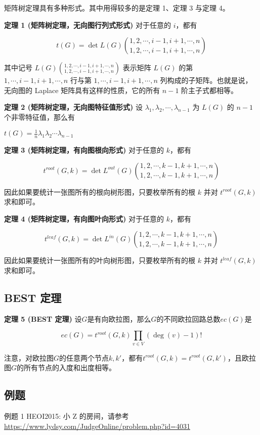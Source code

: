 矩阵树定理具有多种形式。其中用得较多的是定理 1、定理 3 与定理 4。

\textbf{定理 1 (矩阵树定理，无向图行列式形式)} 对于任意的 $i$，都有

$$
t(G) = \det L(G)\binom{1,2,\cdots,i-1,i+1,\cdots,n}{1,2,\cdots,i-1,i+1,\cdots,n}
$$

其中记号 $L(G)\binom{1,2,\cdots,i-1,i+1,\cdots,n}{1,2,\cdots,i-1,i+1,\cdots,n}$ 表示矩阵 $L(G)$ 的第 $1,\cdots,i-1,i+1,\cdots,n$ 行与第 $1,\cdots,i-1,i+1,\cdots,n$ 列构成的子矩阵。也就是说，无向图的 Laplace 矩阵具有这样的性质，它的所有 $n-1$ 阶主子式都相等。

\textbf{定理 2 (矩阵树定理，无向图特征值形式)} 设 $\lambda_1, \lambda_2, \cdots, \lambda_{n-1}$ 为 $L(G)$ 的 $n - 1$ 个非零特征值，那么有

$t(G) = \frac{1}{n}\lambda_1\lambda_2\cdots\lambda_{n-1}$

\textbf{定理 3 (矩阵树定理，有向图根向形式)} 对于任意的 $k$，都有

$$
t^{root}(G,k) = \det L^{out}(G)\binom{1,2,\cdots,k-1,k+1,\cdots,n}{1,2,\cdots,k-1,k+1,\cdots,n}
$$

因此如果要统计一张图所有的根向树形图，只要枚举所有的根 $k$ 并对 $t^{root}(G,k)$ 求和即可。

\textbf{定理 4 (矩阵树定理，有向图叶向形式)} 对于任意的 $k$，都有

$$
t^{leaf}(G,k) = \det L^{in}(G)\binom{1,2,\cdots,k-1,k+1,\cdots,n}{1,2,\cdots,k-1,k+1,\cdots,n}
$$

因此如果要统计一张图所有的叶向树形图，只要枚举所有的根 $k$ 并对 $t^{leaf}(G,k)$ 求和即可。

\subsection{BEST 定理}

\textbf{定理 5 (BEST 定理)} 设$G$是有向欧拉图，那么$G$的不同欧拉回路总数$ec(G)$是

$$
ec(G) = t^{root}(G,k)\prod_{v\in V}(\deg (v) - 1)!
$$

注意，对欧拉图$G$的任意两个节点$k, k'$，都有$t^{root}(G,k)=t^{root}(G,k')$，且欧拉图$G$的所有节点的入度和出度相等。

\subsection{例题}

\begin{NOTE}{例题 1}{}
HEOI2015: 小 Z 的房间，请参考\url{https://www.lydsy.com/JudgeOnline/problem.php?id=4031}

\end{NOTE}


